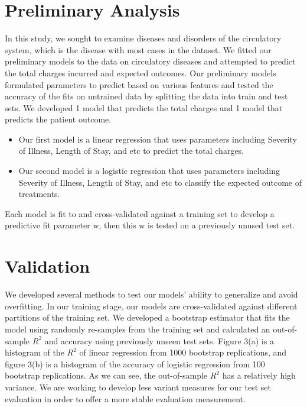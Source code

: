 \documentclass[12pt]{article}
\begin{document}
\section{Preliminary Analysis}	 					
In this study, we sought to examine diseases and disorders of the circulatory system, which is the disease with most cases in the dataset. We fitted our preliminary models to the data on circulatory diseases and attempted to predict the total charges incurred and expected outcomes. Our preliminary models formulated parameters to predict based on various features and tested the accuracy of the fits on untrained data by splitting the data into train and test sets. \bigskip
\newline We developed 1 model that predicts the total charges and 1 model that predicts the patient outcome. 
\begin{itemize}
\item Our first model is a linear regression that uses parameters including Severity of Illness, Length of Stay, and etc to predict the total charges.

\item Our second model is a logistic regression that uses parameters including Severity of Illness, Length of Stay, and etc to classify the expected outcome of treatments.

\end{itemize}

\noindent Each model is fit to and cross-validated against a training set to develop a predictive fit parameter w, then this w is tested on a previously unused test set.

\section{Validation}
We developed several methods to test our models’ ability to generalize and avoid overfitting. In our training stage, our models are cross-validated against different partitions of the training set. We developed a bootstrap estimator that fits the model using randomly re-samples from the training set and calculated an out-of-sample $R^2$ and accuracy using previously unseen test sets. \bigskip
\newline Figure 3(a) is a histogram of the $R^2$ of linear regression from 1000 bootstrap replications, and figure 3(b) is a histogram of the accuracy of logistic regression from 100 bootstrap replications. As we can see, the out-of-sample $R^2$ has a relatively high variance. We are working to develop less variant measures for our test set evaluation in order to offer a more stable evaluation measurement.
\end{document}
